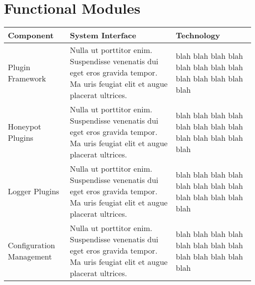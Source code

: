 \section*{\color{NavyBlue}Functional Modules}

\large

\begin{center}
\begin{tabularx}{\linewidth}{X | X | X}
\toprule
\textbf{Component} & \textbf{System Interface} & \textbf{Technology} \\
\midrule
Plugin Framework & Nulla ut porttitor enim. Suspendisse venenatis dui eget eros gravida tempor. Ma uris feugiat elit et augue placerat ultrices. &  blah blah blah blah blah blah blah blah blah blah blah blah blah \\ \hline
Honeypot Plugins & Nulla ut porttitor enim. Suspendisse venenatis dui eget eros gravida tempor. Ma uris feugiat elit et augue placerat ultrices. &  blah blah blah blah blah blah blah blah blah blah blah blah blah \\ \hline
Logger Plugins & Nulla ut porttitor enim. Suspendisse venenatis dui eget eros gravida tempor. Ma uris feugiat elit et augue placerat ultrices. &  blah blah blah blah blah blah blah blah blah blah blah blah blah \\ \hline
Configuration Management & Nulla ut porttitor enim. Suspendisse venenatis dui eget eros gravida tempor. Ma uris feugiat elit et augue placerat ultrices. &  blah blah blah blah blah blah blah blah blah blah blah blah blah \\
\bottomrule
\end{tabularx}
\end{center}
